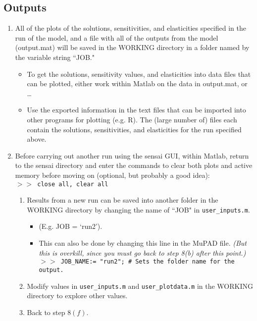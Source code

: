 \documentclass[12pt]{article}
\begin{document}
\subsection{Outputs}

\begin{enumerate}

\item All of the plots of the solutions, sensitivities, and elasticities specified in the run of the model, and a file with all of the outputs from the model (output.mat) will be saved in the WORKING directory in a folder named by the variable string ``JOB."

 \begin{itemize}
  \item To get the solutions, sensitivity values, and elasticities into data files that can be plotted, either work within M{\sc atlab} on the data in output.mat, or \dots
  \item Use the exported information in the text files that can be imported into other programs for plotting (e.g. R).  The (large number of) files each contain the solutions, sensitivities, and elasticities for the run specified above.
 \end{itemize}

\item Before carrying out another run using the {\sc sensai} GUI, within M{\sc atlab}, return to the {\sc sensai} directory and enter the commands to clear both plots and active memory before moving on (optional, but probably a good idea):\\
{\tt $>>$ close all, clear all}
 \begin{enumerate}
  \item Results from a new run can be saved into another folder in the WORKING directory by changing the name of ``JOB" in {\tt user\_inputs.m}.
    \begin{itemize}
    \item (E.g. JOB = `run2').
    \item This can also be done by changing this line in the MuPAD file. \textit{(But this is overkill, since you must go back to step 8(b) after this point.)}\\
{\tt $>>$ JOB\_NAME:= "run2";  \#  Sets the folder name for the output.}
    \end{itemize}
  \item Modify values in {\tt user\_inputs.m} and {\tt user\_plotdata.m} in the WORKING directory to explore other values.
  \item Back to step $8(f)$.
 \end{enumerate}

\end{enumerate}
\end{document}
